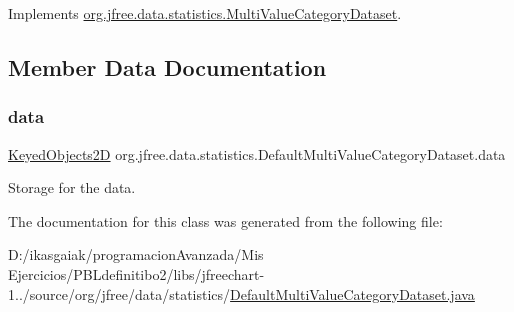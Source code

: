 Implements \mbox{\hyperlink{interfaceorg_1_1jfree_1_1data_1_1statistics_1_1_multi_value_category_dataset_a59a071f5642de62b2f79d3fae9e3fdbf}{org.\+jfree.\+data.\+statistics.\+Multi\+Value\+Category\+Dataset}}.



\subsection{Member Data Documentation}
\mbox{\label{classorg_1_1jfree_1_1data_1_1statistics_1_1_default_multi_value_category_dataset_a4c2294fd2d856df1020bd123e3cddab4}} 
\subsubsection{\texorpdfstring{data}{data}}
{\footnotesize\ttfamily \mbox{\hyperlink{classorg_1_1jfree_1_1data_1_1_keyed_objects2_d}{Keyed\+Objects2D}} org.\+jfree.\+data.\+statistics.\+Default\+Multi\+Value\+Category\+Dataset.\+data\hspace{0.3cm}{\ttfamily [protected]}}

Storage for the data. 

The documentation for this class was generated from the following file\+:\begin{DoxyCompactItemize}
\item 
D\+:/ikasgaiak/programacion\+Avanzada/\+Mis Ejercicios/\+P\+B\+Ldefinitibo2/libs/jfreechart-\/1../source/org/jfree/data/statistics/\mbox{\hyperlink{_default_multi_value_category_dataset_8java}{Default\+Multi\+Value\+Category\+Dataset.\+java}}\end{DoxyCompactItemize}
